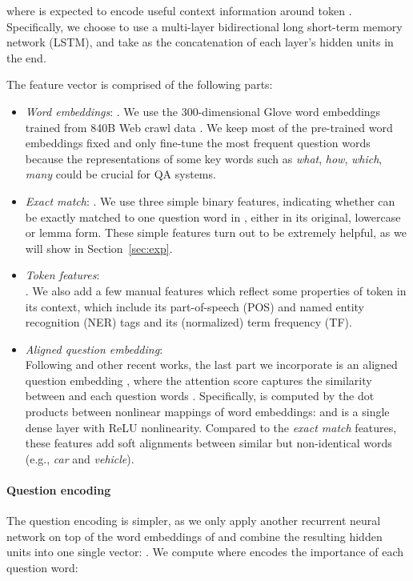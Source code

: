 \documentclass[11pt,a4paper]{article}
\begin{document}
where  is expected to encode useful context information around token . Specifically, we choose to use a multi-layer bidirectional long short-term memory network (LSTM), and take  as the concatenation of each layer's hidden units in the end.

The feature vector  is comprised of the following parts:
\begin{itemize}
    \item
\emph{Word embeddings}: . We use the 300-dimensional Glove word embeddings trained from 840B Web crawl data \cite{pennington2014glove}. We keep most of the pre-trained word embeddings fixed and only fine-tune the  most frequent question words because the representations of some key words such as \textit{what}, \textit{how}, \textit{which}, \textit{many} could be crucial for QA systems.
    \item
\emph{Exact match}: . We use three simple binary features, indicating whether  can be exactly matched to one question word in , either in its original, lowercase or lemma form. These simple features turn out to be extremely helpful, as we will show in Section~\ref{sec:exp}.
    \item
\emph{Token features}: \\ . We also add a few manual features which reflect some properties of token  in its context, which include its part-of-speech (POS) and named entity recognition (NER) tags and its (normalized) term frequency (TF).
    \item
\emph{Aligned question embedding}: \\ Following \cite{lee2016learning} and other recent works, the last part we incorporate is an aligned question embedding , where the attention score  captures the similarity between  and each question words . Specifically,  is computed by the dot products between nonlinear mappings of word embeddings: 
     and  is a single dense layer with ReLU nonlinearity. Compared to the \emph{exact match} features, these features add soft alignments between similar but non-identical words (e.g., \textit{car} and \textit{vehicle}).
\end{itemize}



\paragraph{\textbf{Question encoding}} The question encoding is simpler, as we only apply another recurrent neural network on top of the word embeddings of  and combine the resulting hidden units into one single vector: . We compute  where  encodes the importance of each question word:
\end{document}
